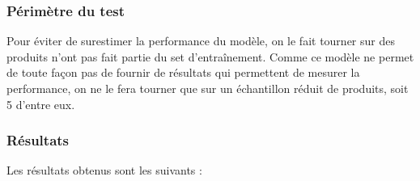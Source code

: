             \subsubsection{Périmètre du test}
            
            Pour éviter de surestimer la performance du modèle, on le fait tourner sur des produits n'ont pas fait partie du set d'entraînement.            
            Comme ce modèle ne permet de toute façon pas de fournir de résultats qui permettent de mesurer la performance, on ne le fera tourner que sur un échantillon réduit de produits, soit 5 d'entre eux.

            \subsubsection{Résultats}

            Les résultats obtenus sont les suivants :

